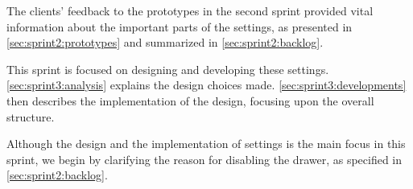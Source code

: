 The clients' feedback to the prototypes in the second sprint provided vital information about the important parts of the settings, as presented in \cref{sec:sprint2:prototypes} and summarized in \cref{sec:sprint2:backlog}.

This sprint is focused on designing and developing these settings.
\cref{sec:sprint3:analysis} explains the design choices made.
\cref{sec:sprint3:developments} then describes the implementation of the design, focusing upon the overall structure.

Although the design and the implementation of settings is the main focus in this sprint, we begin by clarifying the reason for disabling the drawer, as specified in \cref{sec:sprint2:backlog}.
